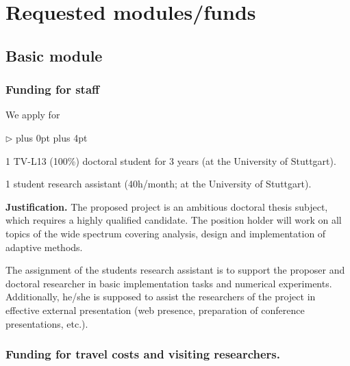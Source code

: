 \documentclass[enabledeprecatedfontcommands,cleardoublepage=empty,headsepline,twoside,11pt,DIV=15,BCOR=12mm,final]{scrartcl}
\renewenvironment{itemize}
{\begin{list}{$\triangleright$}{\labelwidth-2mm \leftmargin3mm %
  \itemsep5pt plus 0pt  \topsep3pt \parsep1pt plus 4pt \labelsep2mm}}
{\end{list}}
\begin{document}
\section{Requested modules/funds}
\label{sec:moduls}

\subsection{Basic module}

\subsubsection{Funding for staff}

We apply for
\begin{itemize}\itemsep=0pt
\item 1 TV-L13 (100\%) doctoral student
  for 3 years (at the University of Stuttgart).
\item 1 student research assistant (40h/month; at the University of Stuttgart).
\end{itemize}
\textbf{Justification.} 
The proposed project is an ambitious doctoral thesis subject, which requires a
highly qualified candidate. The position holder will work on all topics
of the wide spectrum covering analysis, design and implementation of adaptive methods. %

The assignment of the students research assistant is to support the proposer and 
doctoral researcher in basic implementation tasks and numerical experiments. 
Additionally, he/she is supposed to assist the researchers of the project in effective
external presentation (web presence, preparation of conference presentations, etc.).


\subsubsection{Funding for travel costs and visiting researchers.}
\end{document}
